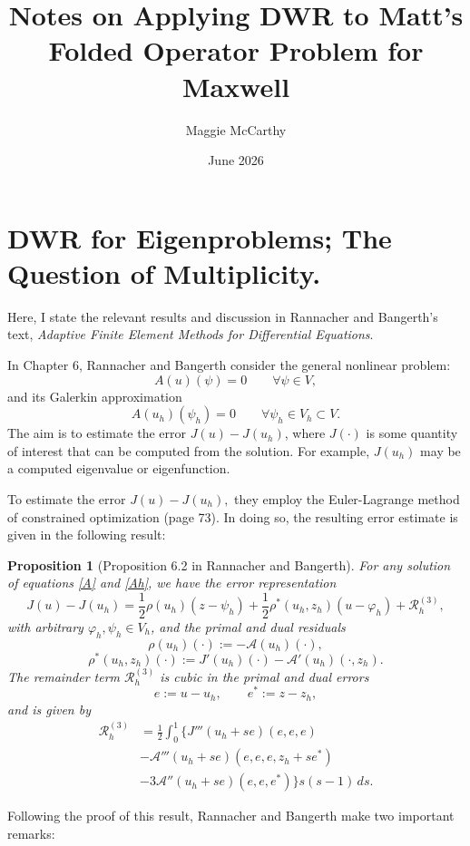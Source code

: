 \documentclass[12pt,a4paper]{article}
\title{Notes on Applying DWR to Matt's Folded Operator Problem for Maxwell }
\author{Maggie McCarthy}
\date{June 2026}
\theoremstyle{boldthm}
\newtheorem{proposition}[theorem]{Proposition}
\theoremstyle{bolddefn}
\begin{document}
\maketitle

\section{DWR for Eigenproblems; The Question of Multiplicity.}

Here, I state the relevant results and discussion in Rannacher and Bangerth's text, \textit{Adaptive Finite Element Methods for Differential Equations}. 


In Chapter 6, Rannacher and Bangerth consider the general nonlinear problem:
\begin{equation}\label{A}
    A(u)(\psi) = 0 \qquad \forall \psi \in V,
\end{equation}
and its Galerkin approximation
\begin{equation}\label{Ah}
    A(u_h)(\psi_h) = 0 \qquad \forall \psi_h \in V_h \subset V.
\end{equation}
The aim is to estimate the error $J(u)-J(u_h)$, where $J(\cdot)$ is some quantity of interest that can be computed from the solution. For example, $J(u_h)$ may be a computed eigenvalue or eigenfunction.

To estimate the error $J(u)-J(u_h),$ they employ the Euler-Lagrange method of constrained optimization (page 73). In doing so, the resulting error estimate is given in the following result: 
\begin{proposition}[Proposition 6.2 in Rannacher and Bangerth]\label{6.2}
For any solution of equations \eqref{A} and \eqref{Ah}, we have the error representation
\[
J(u)-J(u_h)
=
\frac{1}{2}\rho(u_h)(z-\psi_h)
+
\frac{1}{2}\rho^{*}(u_h,z_h)(u-\varphi_h)
+
\mathcal{R}^{(3)}_h,
\]
with arbitrary \(\varphi_h,\psi_h\in V_h\), and the primal and dual residuals
\[
\rho(u_h)(\cdot):=-\mathcal{A}(u_h)(\cdot),
\]
\[
\rho^{*}(u_h,z_h)(\cdot)
:=
J'(u_h)(\cdot)-\mathcal{A}'(u_h)(\cdot,z_h).
\]
The remainder term \(\mathcal{R}^{(3)}_h\) is cubic in the primal and dual errors
\[
e:=u-u_h,
\qquad
e^{*}:=z-z_h,
\]
and is given by
\begin{equation}
\begin{aligned}
\mathcal{R}^{(3)}_h
&=
\frac{1}{2}
\int_0^1
\Big\{
J'''(u_h+se)(e,e,e)
\\ &-
\mathcal{A}'''(u_h+se)(e,e,e,z_h+se^{*})
\\ &- 
3\mathcal{A}''(u_h+se)(e,e,e^{*})
\Big\}
s(s-1)\,ds.
\end{aligned}
\end{equation}
\end{proposition}
Following the proof of this result, Rannacher and Bangerth make two important remarks:
\end{document}
